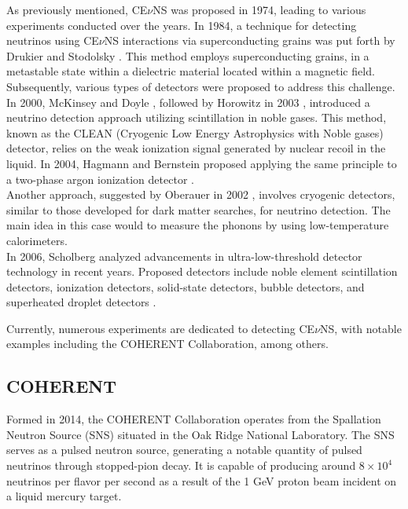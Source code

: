 As previously mentioned, CE$\nu$NS was proposed in 1974, leading to various experiments conducted over the years. In 1984, a technique for detecting neutrinos using CE$\nu$NS interactions via superconducting grains was put forth by Drukier and Stodolsky \cite{Drukier}. This method employs superconducting grains, in a metastable state within a dielectric material located within a magnetic field.\\

Subsequently, various types of detectors were proposed to address this challenge. In 2000, McKinsey and Doyle \cite{mckinsey1999liquid}, followed by Horowitz in 2003 \cite{Horowitz}, introduced a neutrino detection approach utilizing scintillation in noble gases. This method, known as the CLEAN (Cryogenic Low Energy Astrophysics with Noble gases) detector, relies on the weak ionization signal generated by nuclear recoil in the liquid. In 2004, Hagmann and Bernstein proposed applying the same principle to a two-phase argon ionization detector \cite{Hagmann_2004}.\\
 Another approach, suggested by Oberauer in 2002 \cite{OBERAUER2002301}, involves cryogenic detectors, similar to those developed for dark matter searches, for neutrino detection. The main idea in this case would to measure the phonons by using low-temperature calorimeters.\\
In 2006, Scholberg analyzed advancements in ultra-low-threshold detector technology in recent years. Proposed detectors include noble element scintillation detectors, ionization detectors, solid-state detectors, bubble detectors, and superheated droplet detectors \cite{Scholberg}.

Currently,  numerous experiments are dedicated to detecting CE$\nu$NS, with notable examples including the COHERENT Collaboration, among others.


\subsection{COHERENT}

Formed in 2014, the COHERENT Collaboration operates from the Spallation Neutron Source (SNS) situated in the Oak Ridge National Laboratory. The SNS serves as a pulsed neutron source, generating a notable quantity of pulsed neutrinos through stopped-pion decay. It is capable of producing around $8 \times 10^4$ neutrinos per flavor per second as a result of the 1 GeV proton beam incident on a liquid mercury target.

